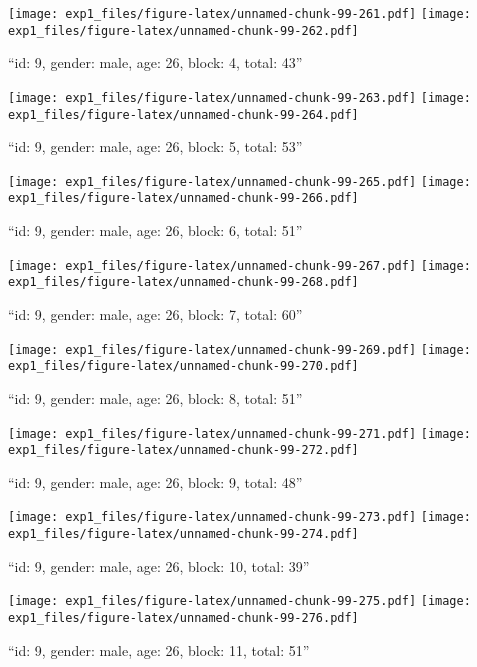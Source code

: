 \documentclass[,]{article}
\begin{document}
\texttt{[image: exp1\_files/figure-latex/unnamed-chunk-99-261.pdf]}
\texttt{[image: exp1\_files/figure-latex/unnamed-chunk-99-262.pdf]}

\newpage
[1] 

``id: 9, gender: male, age: 26, block: 4, total: 43''

\texttt{[image: exp1\_files/figure-latex/unnamed-chunk-99-263.pdf]}
\texttt{[image: exp1\_files/figure-latex/unnamed-chunk-99-264.pdf]}

\newpage
[1] 

``id: 9, gender: male, age: 26, block: 5, total: 53''

\texttt{[image: exp1\_files/figure-latex/unnamed-chunk-99-265.pdf]}
\texttt{[image: exp1\_files/figure-latex/unnamed-chunk-99-266.pdf]}

\newpage
[1] 

``id: 9, gender: male, age: 26, block: 6, total: 51''

\texttt{[image: exp1\_files/figure-latex/unnamed-chunk-99-267.pdf]}
\texttt{[image: exp1\_files/figure-latex/unnamed-chunk-99-268.pdf]}

\newpage
[1] 

``id: 9, gender: male, age: 26, block: 7, total: 60''

\texttt{[image: exp1\_files/figure-latex/unnamed-chunk-99-269.pdf]}
\texttt{[image: exp1\_files/figure-latex/unnamed-chunk-99-270.pdf]}

\newpage
[1] 

``id: 9, gender: male, age: 26, block: 8, total: 51''

\texttt{[image: exp1\_files/figure-latex/unnamed-chunk-99-271.pdf]}
\texttt{[image: exp1\_files/figure-latex/unnamed-chunk-99-272.pdf]}

\newpage
[1] 

``id: 9, gender: male, age: 26, block: 9, total: 48''

\texttt{[image: exp1\_files/figure-latex/unnamed-chunk-99-273.pdf]}
\texttt{[image: exp1\_files/figure-latex/unnamed-chunk-99-274.pdf]}

\newpage
[1] 

``id: 9, gender: male, age: 26, block: 10, total: 39''

\texttt{[image: exp1\_files/figure-latex/unnamed-chunk-99-275.pdf]}
\texttt{[image: exp1\_files/figure-latex/unnamed-chunk-99-276.pdf]}

\newpage
[1] 

``id: 9, gender: male, age: 26, block: 11, total: 51''
\end{document}
